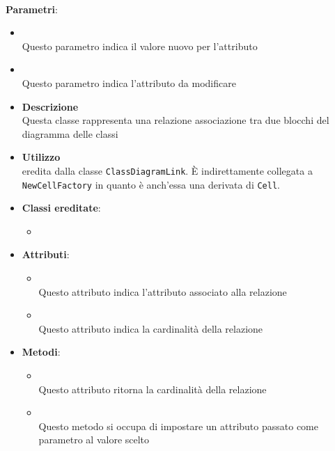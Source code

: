 \begin{itemize}
\begin{itemize}
\\ \textbf{Parametri}:
\begin{itemize}
\item {}
\\ Questo parametro indica il valore nuovo per l'attributo
\item {}
\\ Questo parametro indica l'attributo da modificare
\end{itemize}
\end{itemize}
\end{itemize}

\label{\nogloxy{swedesigner::client::model::celltypes::class::HxAssociation}}
\begin{itemize}
\item \textbf{Descrizione}\\
Questa classe rappresenta una relazione associazione tra due blocchi del diagramma delle classi
\item \textbf{Utilizzo}\\
eredita dalla classe \texttt{ClassDiagramLink}. È indirettamente collegata a \texttt{NewCellFactory} in quanto è anch'essa una derivata di \texttt{Cell}.
\item \textbf{Classi ereditate}:
\begin{itemize}
\item \hyperref[\nogloxy{swedesigner::client::model::celltypes::class::ClassDiagramLink}]{}
\end{itemize}
\item \textbf{Attributi}:
\begin{itemize}
\item {}
\\ Questo attributo indica l'attributo associato alla relazione
\item {}
\\ Questo attributo indica la cardinalità della relazione
\end{itemize}
\item \textbf{Metodi}:
\begin{itemize}
\item {}
\\ Questo attributo ritorna la cardinalità della relazione
\item {}
\\ Questo metodo si occupa di impostare un attributo passato come parametro al valore scelto


\end{itemize}
\end{itemize}
